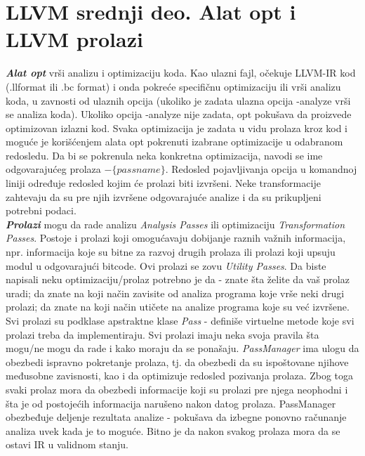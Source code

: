 \documentclass[10pt]{extarticle}
\begin{document}
\section{LLVM srednji deo. Alat opt i LLVM prolazi}
\noindent
\textit{\textbf{Alat opt}} vrši analizu i optimizaciju koda. Kao ulazni fajl, očekuje LLVM-IR kod (.llformat ili .bc format) i onda pokreće specifičnu optimizaciju ili vrši analizu koda, u zavnosti od ulaznih opcija (ukoliko je zadata ulazna opcija -analyze vrši se analiza koda). Ukoliko opcija -analyze nije zadata, opt pokušava da proizvede optimizovan izlazni kod.
Svaka optimizacija je zadata u vidu prolaza kroz kod i moguće je korišćenjem alata opt pokrenuti izabrane optimizacije u odabranom redosledu. Da bi se pokrenula neka konkretna optimizacija, navodi se ime odgovarajućeg prolaza $-\{passname\}$. Redosled pojavljivanja opcija u komandnoj liniji određuje redosled kojim će prolazi biti izvršeni. Neke transformacije zahtevaju da su pre njih izvršene odgovarajuće analize i da su prikupljeni potrebni podaci. \\
\textit{\textbf{Prolazi}} mogu da rade analizu \textit{Analysis Passes} ili optimizaciju \textit{Transformation Passes}. Postoje i prolazi koji omogućavaju dobijanje raznih važnih informacija, npr. informacija koje su bitne za razvoj drugih prolaza ili prolazi koji upsuju modul u odgovarajući bitcode. Ovi prolazi se zovu \textit{Utility Passes}.
Da biste napisali neku optimizaciju/prolaz potrebno je da - znate šta želite da vaš prolaz uradi; da znate na koji način zavisite od analiza programa koje vrše neki drugi prolazi; da znate na koji način utičete na analize programa koje su već izvršene. Svi prolazi su podklase apstraktne klase \textit{Pass} - definiše virtuelne metode koje svi prolazi treba da implementiraju. Svi prolazi imaju neka svoja pravila šta mogu/ne mogu da rade i kako moraju da se ponašaju.
\textit{PassManager} ima ulogu da obezbedi ispravno pokretanje prolaza, tj. da obezbedi da su ispoštovane njihove međusobne zavisnosti, kao i da optimizuje redosled pozivanja prolaza. Zbog toga svaki prolaz mora da obezbedi informacije koji su prolazi pre njega neophodni i šta je od postojećih informacija narušeno nakon datog prolaza. PassManager obezbeđuje deljenje rezultata analize - pokušava da izbegne ponovno računanje analiza uvek kada je to moguće.
Bitno je da nakon svakog prolaza mora da se ostavi IR u validnom stanju.
\end{document}
